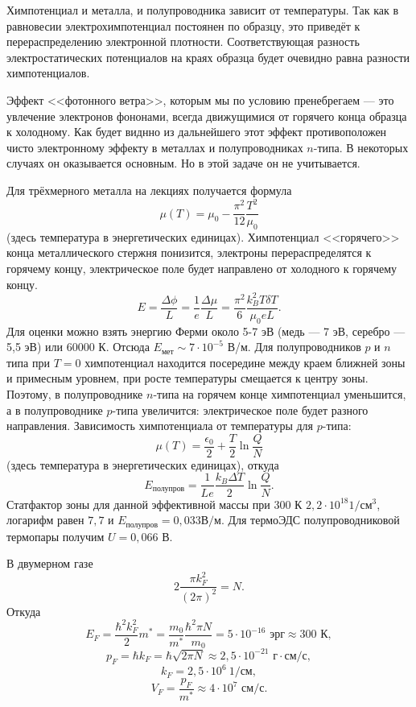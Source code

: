 \documentclass[a4paper]{article}
\begin{document}
\begin{hiProb}[Т11-3]
\end{hiProb}
\begin{sol}
Химпотенциал и металла, и полупроводника зависит от
температуры. Так как в  равновесии
электрохимпотенциал постоянен по образцу, это приведёт
к перераспределению  электронной плотности. Соответствующая разность электростатических
потенциалов на краях образца будет очевидно равна
разности химпотенциалов.

Эффект <<фотонного ветра>>, которым мы по условию
пренебрегаем --- это  увлечение электронов фононами,
всегда движущимися от горячего конца образца
к холодному. Как будет виднно из дальнейшего этот
эффект противоположен чисто электронному эффекту в
металлах и полупроводниках $n$-типа. В некоторых
случаях он оказывается основным. Но в этой задаче
он не учитывается.

Для трёхмерного металла на лекциях получается формула
\[
	\mu(T)= \mu_0 - \frac{\pi^2}{12} \frac{T^2}{\mu_0} 
\]
(здесь температура в энергетических единицах).
Химпотенциал  <<горячего>> конца металлического
стержня понизится, электроны перераспределятся к
горячему концу, электрическое поле
будет направлено от холодного к горячему концу.
\[
E= \frac{\Delta \phi}{L}= \frac{1}{e} \frac{\Delta \mu}{L}= \frac{\pi^2}{6} \frac{k_B^2 T \delta T}{\mu_0
eL}
.\] 
Для оценки можно взять энергию Ферми около 5-7 эВ (медь
--- 7 эВ, серебро --- 5,5 эВ) или 60000 К. Отсюда
$E_{\text{мет}}\sim  7\cdot 10^{-5}$ В/м. Для полупроводников $p$  и $n$  типа при  $T=0$ 
химпотенциал находится посередине между краем ближней
зоны и примесным уровнем, при росте  температуры
смещается к  центру зоны. Поэтому, в полупроводнике
$n$-типа на горячем конце химпотенциал   уменьшится,
а в полупроводнике  $p$-типа увеличится: электрическое
поле будет  разного направления. Зависимость
химпотенциала от  температуры  для $p$-типа:
\[
	\mu(T)= \frac{\epsilon_0}{2}+\frac{T}{2}
	\ln  \frac{Q}{N}
\]
(здесь температура в энергетических единицах),
откуда \[E_\text{полупров}= \frac{1}{Le} \frac{k_B \Delta T}{2} \ln \frac{Q}{N}.\] Статфактор
зоны для данной эффективной массы при 300 К $2,2 \cdot 10^{18} 1/ \text{см}^3$, логарифм равен $7,7$ и
$E_{\text{полупров}}=0,033 \text{В} / \text{м}$.
Для термоЭДС полупроводниковой термопары получим 
$U=0,066$ В.
\end{sol}
\begin{hiProb}[Т11-4]
\end{hiProb}
\begin{sol}
В двумерном газе 
\[
	2 \frac{\pi k_F^2}{(2\pi)^2}=N
.\] 
Откуда
\[
E_F= \frac{\hbar ^2 k_F^2}{2}m^*= \frac{m_0}{m^*}
\frac{\hbar ^2 \pi N}{m_0}=  5\cdot 10^{-16}\text{ эрг}
\approx 300 \text{ К}
,\]
\[
p_F= \hbar  k_F= \hbar  \sqrt{2 \pi N} \approx
2,5 \cdot 10^{-21} \text{ г}\cdot \text{см} /\text{с}
,\] 
\[
k_F= 2,5 \cdot 10^6 \ 1 / \text{см}
,\] 
\[
V_F=\frac{p_F}{m^*} \approx 4\cdot 10^7 \text{ см} /
\text{с}
.\] 
\end{sol}
\end{document}
